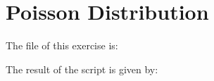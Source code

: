 \section{Poisson Distribution}

The file of this exercise is:



The result of the script is given by:

